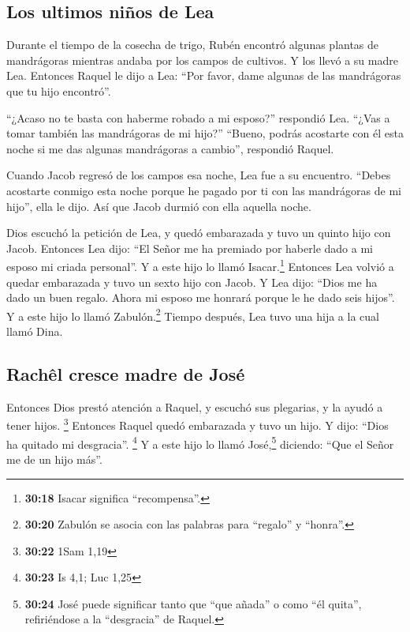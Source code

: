 \hypertarget{los-ultimos-niuxf1os-de-lea}{%
\subsection{Los ultimos niños de
Lea}\label{los-ultimos-niuxf1os-de-lea}}

 Durante el tiempo de la cosecha de trigo, Rubén encontró
algunas plantas de mandrágoras mientras andaba por los campos de
cultivos. Y los llevó a su madre Lea. Entonces Raquel le dijo a Lea:
``Por favor, dame algunas de las mandrágoras que tu hijo encontró''.

 ``¿Acaso no te basta con haberme robado a mi esposo?''
respondió Lea. ``¿Vas a tomar también las mandrágoras de mi hijo?''
``Bueno, podrás acostarte con él esta noche si me das algunas
mandrágoras a cambio'', respondió Raquel.

 Cuando Jacob regresó de los campos esa noche, Lea fue a
su encuentro. ``Debes acostarte conmigo esta noche porque he pagado por
ti con las mandrágoras de mi hijo'', ella le dijo. Así que Jacob durmió
con ella aquella noche.

 Dios escuchó la petición de Lea, y quedó embarazada y
tuvo un quinto hijo con Jacob.  Entonces Lea dijo: ``El
Señor me ha premiado por haberle dado a mi esposo mi criada personal''.
Y a este hijo lo llamó Isacar.\footnote{\textbf{30:18} Isacar significa
  ``recompensa''.}  Entonces Lea volvió a quedar
embarazada y tuvo un sexto hijo con Jacob.  Y Lea dijo:
``Dios me ha dado un buen regalo. Ahora mi esposo me honrará porque le
he dado seis hijos''. Y a este hijo lo llamó Zabulón.\footnote{\textbf{30:20}
  Zabulón se asocia con las palabras para ``regalo'' y ``honra''.}
 Tiempo después, Lea tuvo una hija a la cual llamó Dina.

\hypertarget{rachuxeal-cresce-madre-de-josuxe9}{%
\subsection{Rachêl cresce madre de
José}\label{rachuxeal-cresce-madre-de-josuxe9}}

 Entonces Dios prestó atención a Raquel, y escuchó sus
plegarias, y la ayudó a tener hijos. \footnote{\textbf{30:22} 1Sam 1,19}
 Entonces Raquel quedó embarazada y tuvo un hijo. Y dijo:
``Dios ha quitado mi desgracia''. \footnote{\textbf{30:23} Is 4,1; Luc
  1,25}  Y a este hijo lo llamó José,\footnote{\textbf{30:24}
  José puede significar tanto que ``que añada'' o como ``él quita'',
  refiriéndose a la ``desgracia'' de Raquel.} diciendo: ``Que el Señor
me de un hijo más''.

